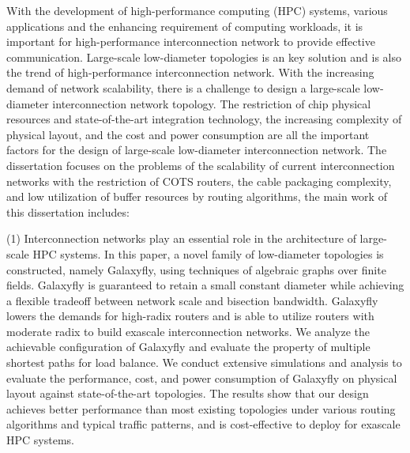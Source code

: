 \begin{eabstract}
  With the development of high-performance computing (HPC) systems,
  various applications and the enhancing requirement of computing workloads,
  it is important for high-performance interconnection network
  to provide effective communication.
  Large-scale low-diameter topologies is an key
  solution and is also the trend of high-performance interconnection network.
  With the increasing demand of network scalability,
  there is a challenge to design a large-scale low-diameter
  interconnection network topology. The restriction of chip physical
  resources and state-of-the-art integration technology,
  the increasing complexity of physical layout,
  and the cost and power consumption are all the important factors
  for the design of large-scale low-diameter interconnection network.
  The dissertation focuses on the problems of the scalability
  of current interconnection networks with the restriction of
  COTS routers, the cable packaging complexity,
  and low utilization of buffer resources by routing algorithms,
  the main work of this dissertation includes:

  (1) Interconnection networks play an essential role
  in the architecture of large-scale HPC systems.
  In this paper, a novel family of low-diameter topologies is constructed,
  namely Galaxyfly, using techniques of algebraic graphs over finite fields.
  Galaxyfly is guaranteed to retain a small constant diameter
  while achieving a flexible tradeoff between network scale
  and bisection bandwidth.
  Galaxyfly lowers the demands for high-radix routers
  and is able to utilize routers with moderate radix to build
  exascale interconnection networks.
  We analyze the achievable configuration of Galaxyfly
  and evaluate the property of multiple
  shortest paths for load balance.
  We conduct extensive simulations and
  analysis to evaluate the performance, cost,
  and power consumption of Galaxyfly on physical layout
  against state-of-the-art topologies.
  The results show that our design achieves better
  performance than most existing topologies
  under various routing algorithms and typical traffic patterns,
  and is cost-effective to deploy for exascale HPC systems.


\end{eabstract}
